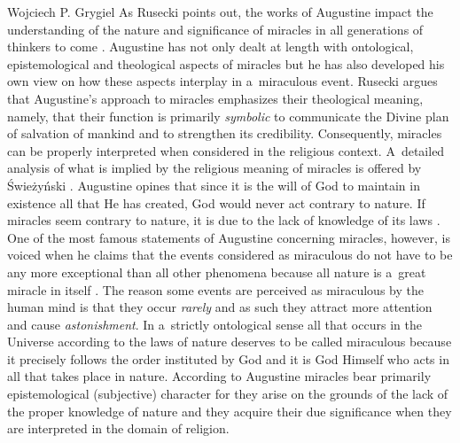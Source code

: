 \begin{artengenv}{Wojciech P. Grygiel}
As Rusecki points out, the works of Augustine impact the understanding of the nature and significance of miracles in all generations of thinkers to come
\parencite[][pp.35–36]{rusecki_traktat_2006}. %
 Augustine has not only dealt at length with ontological, epistemological and theological aspects of miracles but he has also developed his own view on how these aspects interplay in a~miraculous event. Rusecki argues that Augustine’s approach to miracles emphasizes their theological meaning, namely, that their function is primarily \textit{symbolic} to communicate the Divine plan of salvation of mankind and to strengthen its credibility. Consequently, miracles can be properly interpreted when considered in the religious context. A~detailed analysis of what is implied by the religious meaning of miracles is offered by Świeżyński 
\parencite*[][pp.225–273]{swiezynski_filozofia_2012}. %
 Augustine opines that since it is the will of God to maintain in existence all that He has created, God would never act contrary to nature. If miracles seem contrary to nature, it is due to the lack of knowledge of its laws 
\parencite[][\textit{The City of God}, XXI.8]{augustine_city_2003}. %
 One of the most famous statements of Augustine concerning miracles, however, is voiced when he claims that the events considered as miraculous do not have to be any more exceptional than all other phenomena because all nature is a~great miracle in itself 
\parencite[][\textit{The City of God}, X.12; X.16-18; XXI.7; XXI.8]{augustine_city_2003}. %
 The reason some events are perceived as miraculous by the human mind is that they occur \textit{rarely} and as such they attract more attention and cause \textit{astonishment}. In a~strictly ontological sense all that occurs in the Universe according to the laws of nature deserves to be called miraculous because it precisely follows the order instituted by God and it is God Himself who acts in all that takes place in nature. According to Augustine miracles bear primarily epistemological (subjective) character for they arise on the grounds of the lack of the proper knowledge of nature and they acquire their due significance when they are interpreted in the domain of religion.


\end{artengenv}
